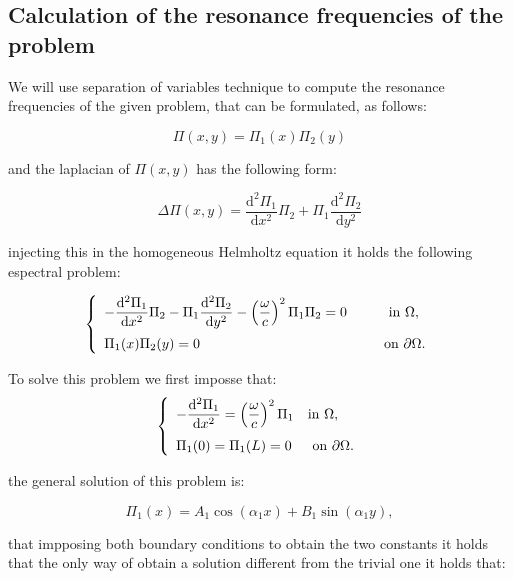 \documentclass{article}[a4paper, 12pt]
\begin{document}
\subsection*{Calculation of the resonance frequencies of the problem}

We will use separation of variables technique to compute the resonance frequencies of the given problem, that can be formulated, as follows:

$$ \Pi(x,y) = \Pi_1(x)\Pi_2(y) $$

and the laplacian of $\Pi(x,y)$ has the following form:


$$ \Delta\Pi(x,y) = \frac{\mathrm{d}^{2} \Pi_{1}} {\mathrm{d} x^{2}} \Pi_{2} +\Pi_{1} \frac{\mathrm{d}^{2} \Pi_{2}} {\mathrm{d}y^{2}} 
$$

injecting this in the homogeneous Helmholtz equation it holds the following espectral problem:


\begin{equation}\label{e_2}
    \left\{\begin{array} {l l} {\displaystyle -\frac{\mathrm{d}^{2} \Pi_{1}} {\mathrm{d} x^{2}} \Pi_{2} -\Pi_{1} \frac{\mathrm{d}^{2} \Pi_{2}} {\mathrm{d} y^{2}} -\left( \frac{\omega} {c} \right)^{2} \Pi_{1} \Pi_{2} =0 ~ ~ ~ ~} & {~ ~ \text{in} ~ \Omega,} \\[2.5ex] {\Pi_1(x)\Pi_2(y)=0} & {~ \text{on} ~ \partial\Omega.} \\ \end{array} 
    \right.
\end{equation}

To solve this problem we first imposse that:
\begin{equation}\label{e_1}
    \left\{\begin{array} {l l} {\displaystyle -\frac{\mathrm{d}^{2} \Pi_{1}} {\mathrm{d} x^{2}} =\left( \frac{\omega} {c} \right)^{2} \Pi_{1}  } & {\text{in} ~ \Omega,} \\[2.5ex] {\Pi_1(0)=\Pi_1(L)=0} & {~ \text{on} ~ \partial\Omega.} \\ \end{array} 
    \right.
\end{equation}


the general solution of this problem is:


$$ \Pi_1(x) = A_1\cos(\alpha_1x) + B_1\sin(\alpha_1y), $$

 that impposing both boundary conditions to obtain the two constants it holds that the only way of obtain a solution different from the trivial one it holds that:
\end{document}
